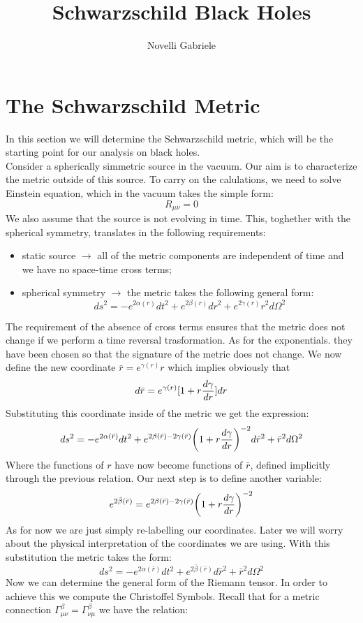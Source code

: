 \documentclass[]{article}
\title{Schwarzschild Black Holes}
\author{Novelli Gabriele}
\date{ }
\theoremstyle{definition}
\theoremstyle{Theorem}
\theoremstyle{definition}
\theoremstyle{definition}
\theoremstyle{definition}
\begin{document}
\maketitle

\section{The Schwarzschild Metric}
In this section we will determine the Schwarzschild metric, which will be the starting point for our analysis on black holes.\\
Consider a spherically simmetric source in the vacuum. Our aim is to characterize the metric outside of this source. To carry on the calulations, we need to solve Einstein equation, which in the vacuum takes the simple form:
$$R_{\mu\nu}=0$$
We also assume that the source is not evolving in time. This, toghether with the spherical symmetry, translates in the following requirements: 
\begin{itemize}
	\item static source $\rightarrow$ all of the metric components are independent of time and we have no space-time cross terms;
	\item spherical symmetry $\rightarrow$ the metric takes the following general form:
	$$ds^2=-e^{2\alpha(r)}dt^2+e^{2\beta(r)}dr^2+e^{2\gamma(r)}r^2d\Omega^2$$
\end{itemize}
The requirement of the absence of cross terms ensures that the metric does not change if we perform a time reversal trasformation. As for the exponentials. they have been chosen so that the signature of the metric does not change. We now define the new coordinate $\bar{r}=e^{\gamma(r)}r$ which implies obviously that $$d\bar{r}=e^{\gamma(r)}[1+r{d\gamma\over dr}]dr$$
Substituting this coordinate inside of the metric we get the expression:
$$ds^2=-e^{2\alpha(\bar{r})}dt^2+e^{2\beta(\bar{r})-2\gamma(\bar{r})}\bigg(1+r{d\gamma\over dr}\bigg)^{-2}d\bar{r}^2+\bar{r}^2d\Omega^2$$
Where the functions of $r$ have now become functions of $\bar{r}$, defined implicitly through the previous relation. Our next step is to define another variable:
$$e^{2\bar{\beta}(\bar{r})}=e^{2\beta(\bar{r})-2\gamma(\bar{r})}\bigg(1+r{d\gamma\over dr}\bigg)^{-2}$$ 
As for now we are just simply re-labelling our coordinates. Later we will worry about the physical interpretation of the coordinates we are using. With this substitution the metric takes the form:
$$ds^2=-e^{2\alpha(\bar{r})}dt^2+e^{2\bar\beta(\bar{r})}d\bar{r}^2+\bar{r}^2d\Omega^2$$
Now we can determine the general form of the Riemann tensor. In order to achieve this we compute the Christoffel Symbols. Recall that for a metric connection $\Gamma_{\mu\nu}^\beta=\Gamma_{\nu\mu}^\beta$ we have the relation:
\end{document}
